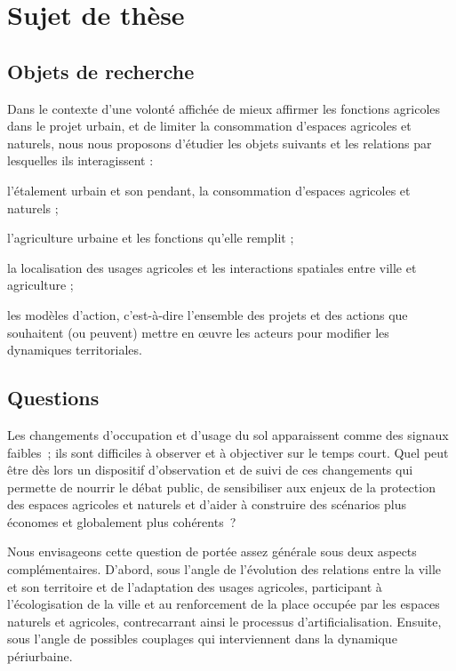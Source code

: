 \page[yes]
\section[sujet]{Sujet de thèse}

\subsection{Objets de recherche}

Dans le contexte d'une volonté affichée de mieux affirmer les fonctions agricoles
dans le projet urbain,
et de limiter la consommation d'espaces agricoles et naturels,
nous nous proposons d'étudier les objets suivants et les relations par lesquelles
ils interagissent :

\startitemize[packed]

\item l'étalement urbain et son pendant, la consommation d'espaces agricoles et naturels ;
\item l'agriculture urbaine et les fonctions qu'elle remplit ;
\item la localisation des usages agricoles
  et les interactions spatiales entre ville et agriculture ;
\item les modèles d'action, c'est-à-dire l'ensemble
  des projets et des actions que souhaitent (ou peuvent) mettre en œuvre
  les acteurs pour modifier les dynamiques territoriales.

\stopitemize

\subsection{Questions}

Les changements d'occupation et d'usage du sol apparaissent comme des signaux faibles~;
ils sont difficiles à observer et à objectiver sur le temps court.
Quel peut être dès lors un dispositif d'observation et de suivi de ces changements
qui permette de nourrir le débat public, de sensibiliser aux enjeux de la protection
des espaces agricoles et naturels et d'aider à construire des scénarios
plus économes et globalement plus cohérents~?

Nous envisageons cette question de portée assez générale
sous deux aspects complémentaires. D'abord, sous l'angle de 
l'évolution des relations entre la ville et son territoire et de l'adaptation
des usages agricoles, participant à l'écologisation de la ville et
au renforcement de la place occupée par les espaces naturels et agricoles,
contrecarrant ainsi le processus d'artificialisation.
Ensuite, sous l'angle de possibles couplages
qui interviennent dans la dynamique périurbaine.

